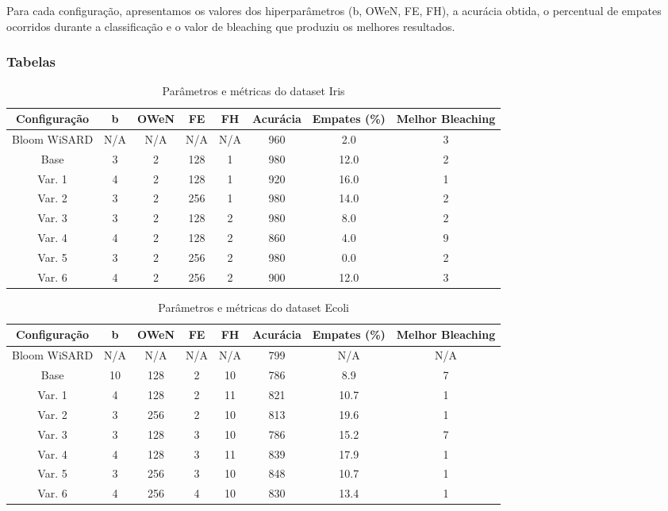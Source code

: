 \documentclass{article}
\begin{document}
Para cada configuração, apresentamos os valores dos hiperparâmetros (b, OWeN, FE, FH), a acurácia obtida, o percentual de empates ocorridos durante a classificação e o valor de bleaching que produziu os melhores resultados.

\subsubsection{Tabelas}

{\small
\begin{table}[h!]
\caption{Parâmetros e métricas do dataset Iris}
\begin{tabular}{|c|c|c|c|c|c|c|c|}
\hline
\textbf{Configuração} & \textbf{b} & \textbf{OWeN} & \textbf{FE} & \textbf{FH} & \textbf{Acurácia} & \textbf{Empates (\%)} & \textbf{Melhor Bleaching} \\
\hline
Bloom WiSARD & N/A & N/A & N/A & N/A & 960 & 2.0 & 3 \\
\hline
Base & 3 & 2 & 128 & 1 & 980 & 12.0 & 2 \\
\hline
Var. 1 & 4 & 2 & 128 & 1 & 920 & 16.0 & 1 \\
\hline
Var. 2 & 3 & 2 & 256 & 1 & 980 & 14.0 & 2 \\
\hline
Var. 3 & 3 & 2 & 128 & 2 & 980 & 8.0 & 2 \\
\hline
Var. 4 & 4 & 2 & 128 & 2 & 860 & 4.0 & 9 \\
\hline
Var. 5 & 3 & 2 & 256 & 2 & 980 & 0.0 & 2 \\
\hline
Var. 6 & 4 & 2 & 256 & 2 & 900 & 12.0 & 3 \\
\hline
\end{tabular}
\end{table}

\begin{table}[h!]
\caption{Parâmetros e métricas do dataset Ecoli}
\begin{tabular}{|c|c|c|c|c|c|c|c|}
\hline
\textbf{Configuração} & \textbf{b} & \textbf{OWeN} & \textbf{FE} & \textbf{FH} & \textbf{Acurácia} & \textbf{Empates (\%)} & \textbf{Melhor Bleaching} \\
\hline
Bloom WiSARD & N/A & N/A & N/A & N/A & 799 & N/A & N/A \\
\hline
Base & 10 & 128 & 2 & 10 & 786 & 8.9 & 7 \\
\hline
Var. 1 & 4 & 128 & 2 & 11 & 821 & 10.7 & 1 \\
\hline
Var. 2 & 3 & 256 & 2 & 10 & 813 & 19.6 & 1 \\
\hline
Var. 3 & 3 & 128 & 3 & 10 & 786 & 15.2 & 7 \\
\hline
Var. 4 & 4 & 128 & 3 & 11 & 839 & 17.9 & 1 \\
\hline
Var. 5 & 3 & 256 & 3 & 10 & 848 & 10.7 & 1 \\
\hline
Var. 6 & 4 & 256 & 4 & 10 & 830 & 13.4 & 1 \\
\hline
\end{tabular}
\end{table}

}
\end{document}
